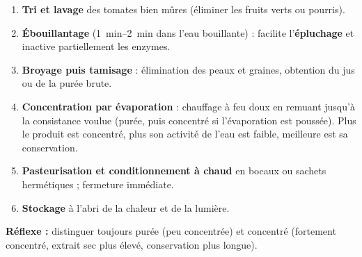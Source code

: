 \documentclass[11pt]{article}
\begin{document}
\begin{methode}
\begin{enumerate}
\item \textbf{Tri et lavage} des tomates bien mûres (éliminer les fruits verts ou pourris).
\item \textbf{Ébouillantage} (\SIrange{1}{2}{min} dans l'eau bouillante) : facilite l'\textbf{épluchage} et inactive partiellement les enzymes.
\item \textbf{Broyage puis tamisage} : élimination des peaux et graines, obtention du jus ou de la purée brute.
\item \textbf{Concentration par évaporation} : chauffage à feu doux en remuant jusqu'à la consistance voulue (purée, puis concentré si l'évaporation est poussée). Plus le produit est concentré, plus son activité de l'eau est faible, meilleure est sa conservation.
\item \textbf{Pasteurisation et conditionnement à chaud} en bocaux ou sachets hermétiques ; fermeture immédiate.
\item \textbf{Stockage} à l'abri de la chaleur et de la lumière.
\end{enumerate}
\textbf{Réflexe :} distinguer toujours purée (peu concentrée) et concentré (fortement concentré, extrait sec plus élevé, conservation plus longue).
\end{methode}
\end{document}
